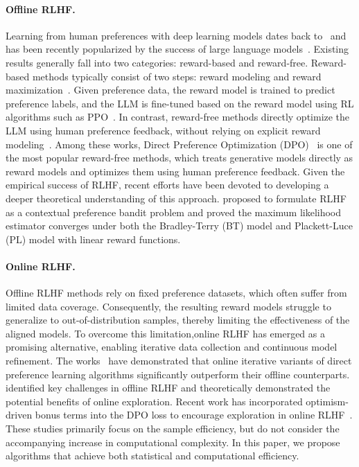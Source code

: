 \paragraph{Offline RLHF.} Learning from human preferences with deep learning models dates back to~\citet{NIPS'17:RLHF} and has been recently popularized by the success of large language models~\citep{arXiv'22:Bai-RLHF, arXiv'23:llama-2, arXiv'23:GPT-4}. Existing results generally fall into two categories: reward-based and reward-free. Reward-based methods typically consist of two steps: reward modeling and reward maximization~\citep{NeurIPS'22:Ouyang-InstructGPT}. Given preference data, the reward model is trained to predict preference labels, and the LLM is fine-tuned based on the reward model using RL algorithms such as PPO~\citep{arXiv'17:PPO}. In contrast, reward-free methods directly optimize the LLM using human preference feedback, without relying on explicit reward modeling~\citep{NeurIPS'23:DPO, AISTATS'24:Azar-IPO}. Among these works, Direct Preference Optimization (DPO)~\citep{NeurIPS'23:DPO} is one of the most popular reward-free methods, which treats generative models directly as reward models and optimizes them using human preference feedback. Given the empirical success of RLHF, recent efforts have been devoted to developing a deeper theoretical understanding of this approach. \citet{ICML'23:Zhu-Principled} proposed to formulate RLHF as a contextual preference bandit problem and proved the maximum likelihood estimator converges under both the Bradley-Terry (BT) model and Plackett-Luce (PL) model with linear reward functions.


\paragraph{Online RLHF.} Offline RLHF methods rely on fixed preference datasets, which often suffer from limited data coverage. Consequently, the resulting reward models struggle to generalize to out-of-distribution samples, thereby limiting the effectiveness of the aligned models. To overcome this limitation,online RLHF has emerged as a promising alternative, enabling iterative data collection and continuous model refinement. The works~\citep{TMLR'23:RAFT,arXiv'24:Guo-Online-AI-feedback,ICML'24:Yuan-Self-rewarding,ICLR'25:Wu-Self-play} have demonstrated that online iterative variants of direct preference learning algorithms significantly outperform their offline counterparts. \citet{ICML'24:Xiong-Iterative} identified key challenges in offline RLHF and theoretically demonstrated the potential benefits of online exploration. Recent work has incorporated optimism-driven bonus terms into the DPO loss to encourage exploration in online RLHF~\citep{ICLR'25:XPO,ICLR'25:VPO,TMLR'25:Zhang-Self-exploring}. These studies primarily focus on the sample efficiency, but do not consider the accompanying increase in computational complexity. In this paper, we propose algorithms that achieve both statistical and computational efficiency.


